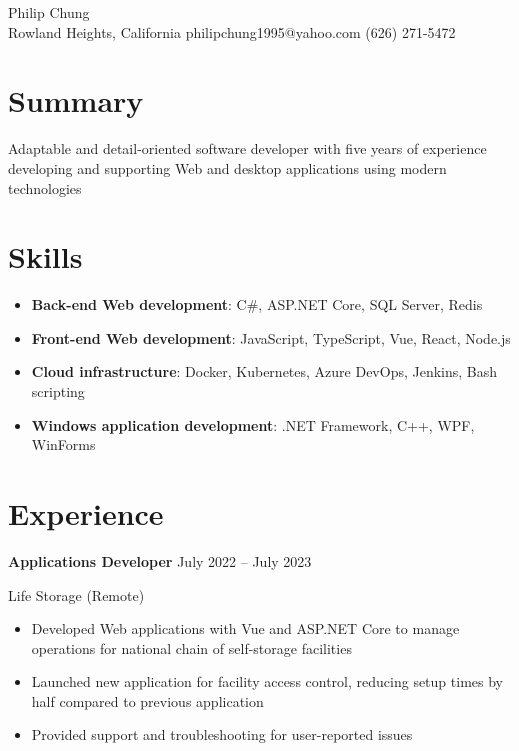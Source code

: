 \documentclass[12pt]{article}
\newcommand{\titleheader}[2]{\textbf{#1} \symbol{"B7} #2}
\newcommand{\locheader}[2]{#1 (#2)}
\begin{document}
	\begin{adjustwidth}{-0.25in}{}
		\begin{center}
			{ Philip Chung} \\ \vspace{0.5em}
			Rowland Heights, California  philipchung1995@yahoo.com  (626) 271-5472
		\end{center}
	\end{adjustwidth}

	\section*{Summary}

	Adaptable and detail-oriented software developer with five years of experience developing and supporting Web and desktop applications using modern technologies

	\section*{Skills}

	\newcommand{\skillitem}[2]{\item \textbf{#1}: #2}

	\begin{itemize}[left=0in .. 0.125in]
		\skillitem{Back-end Web development}{C\#, ASP.NET Core, SQL Server, Redis}
		\skillitem{Front-end Web development}{JavaScript, TypeScript, Vue, React, Node.js}
		\skillitem{Cloud infrastructure}{Docker, Kubernetes, Azure DevOps, Jenkins, Bash scripting}
		\skillitem{Windows application development}{.NET Framework, C++, WPF, WinForms}
	\end{itemize}

	\section*{Experience}

	\titleheader{Applications Developer}{July 2022 -- July 2023}

	\locheader{Life Storage}{Remote}

	\begin{itemize}
		\item Developed Web applications with Vue and ASP.NET Core to manage operations for national chain of self-storage facilities
		\item Launched new application for facility access control, reducing setup times by half compared to previous application
		\item Provided support and troubleshooting for user-reported issues
	\end{itemize}
\end{document}
